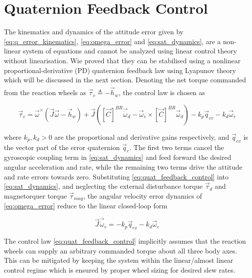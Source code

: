 \section{Quaternion Feedback Control}
The kinematics and dynamics of the attitude error given by \eqref{eq:q_error_kinematics}, \eqref{eq:omega_error} and \eqref{eq:sat_dynamics}, are a non-linear system of equations and cannot be analyzed using linear control theory without linearisation. Wie \cite{wieSpaceVehicleDynamics1998} proved that they can be stabilised using a nonlinear proportional-derivative (PD) quaternion feedback law using Lyapunov theory which will be discussed in the next section. Denoting the net torque commanded from the reaction wheels as $\vec{\tau}_c \triangleq -\dot{\vec{h}}_w$, the control law is chosen as

\begin{equation}
    \vec{\tau}_c = \vec{\omega}^\times(\vec{J}\vec{\omega} - \vec{h}_w) + \vec{J}\left([\vec{C}]^{BR}\vec{\dot{\omega}}_d - \vec{\omega}_e \times [\vec{C}]^{BR}\vec{\omega}_d\right) - k_p \vec{q}_{ev} - k_d \vec{\omega}_e
    \label{eq:quat_feedback_control}
\end{equation}

where $k_p, k_d > 0$ are the proportional and derivative gains respectively, and $\vec{q}_{ev}$ is the vector part of the error quaternion $\vec{q}_e$. The first two terms cancel the gyroscopic coupling term in \eqref{eq:sat_dynamics} and feed forward the desired angular acceleration and rate, while the remaining two terms drive the attitude and rate errors towards zero. Substituting \eqref{eq:quat_feedback_control} into \eqref{eq:sat_dynamics}, and neglecting the external disturbance torque $\vec{\tau}_d$ and magnetorquer torque $\vec{\tau}_{mag}$, the angular velocity error dynamics of \eqref{eq:omega_error} reduce to the linear closed-loop form

\begin{equation}
    \vec{J}\vec{\dot{\omega}}_e = -k_p \vec{q}_{ev} - k_d \vec{\omega}_e
    \label{eq:quat_feedback_closed_loop}
\end{equation}


The control law \eqref{eq:quat_feedback_control} implicitly assumes that the reaction wheels can supply an arbitrary commanded torque about all three body axes. This can be mitigated by keeping the system within the linear/almost linear control regime which is ensured by proper wheel sizing for desired slew rates. 

